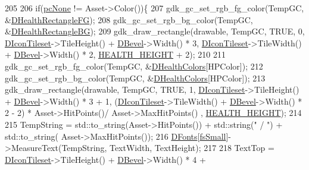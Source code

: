 \begin{DoxyCode}
205 
206                 \textcolor{keywordflow}{if}(\hyperlink{GameDataTypes_8h_aafb0ca75933357ff28a6d7efbdd7602fa88767aa8e02c7b3192bbab4127b3d729}{pcNone} != Asset->Color())\{
207                     gdk\_gc\_set\_rgb\_fg\_color(TempGC, &\hyperlink{classCUnitDescriptionRenderer_a0853b06022be60337a5015efb90666bd}{DHealthRectangleFG});
208                     gdk\_gc\_set\_rgb\_bg\_color(TempGC, &\hyperlink{classCUnitDescriptionRenderer_ac3f81e657b619785c3babd9026b7c6d2}{DHealthRectangleBG});
209                     gdk\_draw\_rectangle(drawable, TempGC, TRUE, 0, \hyperlink{classCUnitDescriptionRenderer_aadf76b5c018d76c3ff7bd8edc021d702}{DIconTileset}->TileHeight() + 
      \hyperlink{classCUnitDescriptionRenderer_a9f4cd9f9d8dbc5036c885980494db41e}{DBevel}->Width() * 3,  \hyperlink{classCUnitDescriptionRenderer_aadf76b5c018d76c3ff7bd8edc021d702}{DIconTileset}->TileWidth() + \hyperlink{classCUnitDescriptionRenderer_a9f4cd9f9d8dbc5036c885980494db41e}{DBevel}->Width() * 2, 
      \hyperlink{UnitDescriptionRenderer_8cpp_a60b382357264e3e39799a678c7f21e38}{HEALTH\_HEIGHT} + 2);
210                     
211                     gdk\_gc\_set\_rgb\_fg\_color(TempGC, &\hyperlink{classCUnitDescriptionRenderer_afa1e3591f74862f7640695f0f6125bc7}{DHealthColors}[HPColor]);
212                     gdk\_gc\_set\_rgb\_bg\_color(TempGC, &\hyperlink{classCUnitDescriptionRenderer_afa1e3591f74862f7640695f0f6125bc7}{DHealthColors}[HPColor]);
213                     gdk\_draw\_rectangle(drawable, TempGC, TRUE, 1, \hyperlink{classCUnitDescriptionRenderer_aadf76b5c018d76c3ff7bd8edc021d702}{DIconTileset}->TileHeight() + 
      \hyperlink{classCUnitDescriptionRenderer_a9f4cd9f9d8dbc5036c885980494db41e}{DBevel}->Width() * 3 + 1,  (\hyperlink{classCUnitDescriptionRenderer_aadf76b5c018d76c3ff7bd8edc021d702}{DIconTileset}->TileWidth() + \hyperlink{classCUnitDescriptionRenderer_a9f4cd9f9d8dbc5036c885980494db41e}{DBevel}->Width() * 2 - 2) * 
      Asset->HitPoints()/ Asset->MaxHitPoints() , \hyperlink{UnitDescriptionRenderer_8cpp_a60b382357264e3e39799a678c7f21e38}{HEALTH\_HEIGHT});
214                     
215                     TempString = std::to\_string(Asset->HitPoints()) + std::string(\textcolor{stringliteral}{" / "}) + std::to\_string(
      Asset->MaxHitPoints());
216                     \hyperlink{classCUnitDescriptionRenderer_a270a545ecdb1602cd2a0a2def8997dc8}{DFonts}[\hyperlink{classCUnitDescriptionRenderer_a3ea4cd83b6dd9533ab3abb953a7da35aaa0ab2dd25d9db891e7a7158795b46c63}{fsSmall}]->MeasureText(TempString, TextWidth, TextHeight);
217                 
218                     TextTop = \hyperlink{classCUnitDescriptionRenderer_aadf76b5c018d76c3ff7bd8edc021d702}{DIconTileset}->TileHeight() + \hyperlink{classCUnitDescriptionRenderer_a9f4cd9f9d8dbc5036c885980494db41e}{DBevel}->Width() * 4 + 

\end{DoxyCode}
